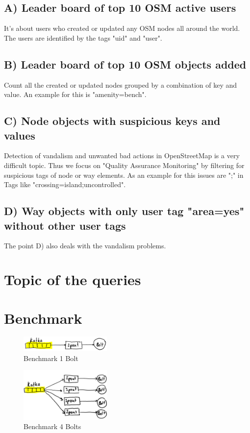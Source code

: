 \subsection{A) Leader board of top 10 OSM active users}
It's about users who created or updated any OSM nodes all around the world.
The users are identified by the tags "uid" and "user".

\subsection{B) Leader board of top 10 OSM objects added}
Count all the created or updated nodes grouped by a combination of key and value.
An example for this is "amenity=bench".

\subsection{C) Node objects with suspicious keys and values}
Detection of vandalism and unwanted bad actions in OpenStreetMap is a very difficult topic.
Thus we focus on "Quality Assurance Monitoring" by filtering for suspicious tags of node or way elements.
As an example for this issues are ";" in Tags like "crossing=island;uncontrolled".

\subsection{D) Way objects with only user tag "area=yes" without other user tags}
The point D) also deals with the vandalism problems.


\newpage
\section{Topic of the queries}


\newpage
\section{Benchmark}
\begin{figure}[H]
\centering
\captionsetup{justification=centering}
\includegraphics[width=0.4\textwidth]{images/benchmark_topic1.png}
\caption[Benchmark 1 Bolt]{Benchmark 1 Bolt}
\end{figure}


\begin{figure}[H]
\centering
\captionsetup{justification=centering}
\includegraphics[width=0.4\textwidth]{images/benchmark_topic2.png}
\caption[Benchmark 4 Bolts]{Benchmark 4 Bolts}
\end{figure}



